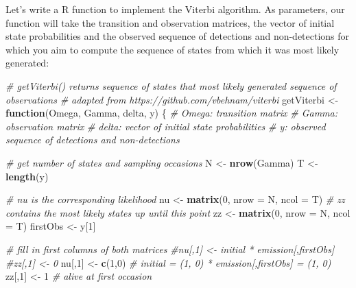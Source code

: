 \documentclass[
  12pt,
]{krantz}
\newenvironment{Shaded}{\begin{snugshade}}{\end{snugshade}}
\newcommand{\AttributeTok}[1]{\textcolor[rgb]{0.13,0.29,0.53}{#1}}
\newcommand{\CommentTok}[1]{\textcolor[rgb]{0.56,0.35,0.01}{\textit{#1}}}
\newcommand{\ControlFlowTok}[1]{\textcolor[rgb]{0.13,0.29,0.53}{\textbf{#1}}}
\newcommand{\DecValTok}[1]{\textcolor[rgb]{0.00,0.00,0.81}{#1}}
\newcommand{\FunctionTok}[1]{\textcolor[rgb]{0.13,0.29,0.53}{\textbf{#1}}}
\newcommand{\NormalTok}[1]{#1}
\newcommand{\OtherTok}[1]{\textcolor[rgb]{0.56,0.35,0.01}{#1}}
\begin{document}
Let's write a R function to implement the Viterbi algorithm. As parameters, our function will take the transition and observation matrices, the vector of initial state probabilities and the observed sequence of detections and non-detections for which you aim to compute the sequence of states from which it was most likely generated:

\begin{Shaded}
\begin{Highlighting}[]
\CommentTok{\# getViterbi() returns sequence of states that most likely generated sequence of observations}
\CommentTok{\# adapted from https://github.com/vbehnam/viterbi}
\NormalTok{getViterbi }\OtherTok{\textless{}{-}} \ControlFlowTok{function}\NormalTok{(Omega, Gamma, delta, y) \{}
\CommentTok{\# Omega: transition matrix}
\CommentTok{\# Gamma: observation matrix}
\CommentTok{\# delta: vector of initial state probabilities}
\CommentTok{\# y: observed sequence of detections and non{-}detections}
  
\CommentTok{\# get number of states and sampling occasions}
\NormalTok{N }\OtherTok{\textless{}{-}} \FunctionTok{nrow}\NormalTok{(Gamma)}
\NormalTok{T }\OtherTok{\textless{}{-}} \FunctionTok{length}\NormalTok{(y)}
  
\CommentTok{\# nu is the corresponding likelihood}
\NormalTok{nu }\OtherTok{\textless{}{-}} \FunctionTok{matrix}\NormalTok{(}\DecValTok{0}\NormalTok{, }\AttributeTok{nrow =}\NormalTok{ N, }\AttributeTok{ncol =}\NormalTok{ T)}
\CommentTok{\# zz contains the most likely states up until this point}
\NormalTok{zz }\OtherTok{\textless{}{-}} \FunctionTok{matrix}\NormalTok{(}\DecValTok{0}\NormalTok{, }\AttributeTok{nrow =}\NormalTok{ N, }\AttributeTok{ncol =}\NormalTok{ T)}
\NormalTok{firstObs }\OtherTok{\textless{}{-}}\NormalTok{ y[}\DecValTok{1}\NormalTok{]}
  
\CommentTok{\# fill in first columns of both matrices}
\CommentTok{\#nu[,1] \textless{}{-} initial * emission[,firstObs]}
\CommentTok{\#zz[,1] \textless{}{-} 0}
\NormalTok{nu[,}\DecValTok{1}\NormalTok{] }\OtherTok{\textless{}{-}} \FunctionTok{c}\NormalTok{(}\DecValTok{1}\NormalTok{,}\DecValTok{0}\NormalTok{) }\CommentTok{\# initial = (1, 0) * emission[,firstObs] = (1, 0)}
\NormalTok{zz[,}\DecValTok{1}\NormalTok{] }\OtherTok{\textless{}{-}} \DecValTok{1} \CommentTok{\# alive at first occasion}


\end{Highlighting}
\end{Shaded}
\end{document}
